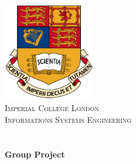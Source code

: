 \begin{titlepage}
\begin{center}

\includegraphics[width=0.30\textwidth]{./logo.png}\\[0.45cm]    

\textsc{\LARGE Imperial College London}\\[1cm]
\textsc{\Large Informations Systems Engineering \\ \vspace{5pt} ~}\\[0.5cm]


\HRule \\[0.4cm]
{ \huge \bfseries Group Project}\\[0.4cm]

\HRule \\[1.5cm]


\end{center}
\end{titlepage}
